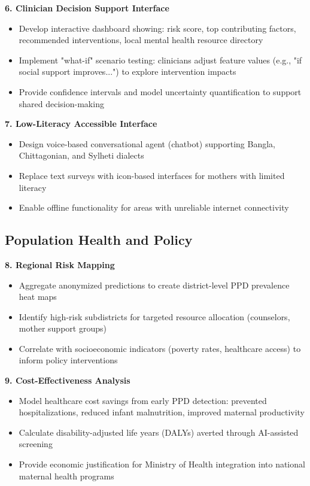 \textbf{6. Clinician Decision Support Interface}
\begin{itemize}
    \item Develop interactive dashboard showing: risk score, top contributing factors, recommended interventions, local mental health resource directory
    \item Implement "what-if" scenario testing: clinicians adjust feature values (e.g., "if social support improves...") to explore intervention impacts
    \item Provide confidence intervals and model uncertainty quantification to support shared decision-making
\end{itemize}

\textbf{7. Low-Literacy Accessible Interface}
\begin{itemize}
    \item Design voice-based conversational agent (chatbot) supporting Bangla, Chittagonian, and Sylheti dialects
    \item Replace text surveys with icon-based interfaces for mothers with limited literacy
    \item Enable offline functionality for areas with unreliable internet connectivity
\end{itemize}

\subsection{Population Health and Policy}

\textbf{8. Regional Risk Mapping}
\begin{itemize}
    \item Aggregate anonymized predictions to create district-level PPD prevalence heat maps
    \item Identify high-risk subdistricts for targeted resource allocation (counselors, mother support groups)
    \item Correlate with socioeconomic indicators (poverty rates, healthcare access) to inform policy interventions
\end{itemize}

\textbf{9. Cost-Effectiveness Analysis}
\begin{itemize}
    \item Model healthcare cost savings from early PPD detection: prevented hospitalizations, reduced infant malnutrition, improved maternal productivity
    \item Calculate disability-adjusted life years (DALYs) averted through AI-assisted screening
    \item Provide economic justification for Ministry of Health integration into national maternal health programs
\end{itemize}

